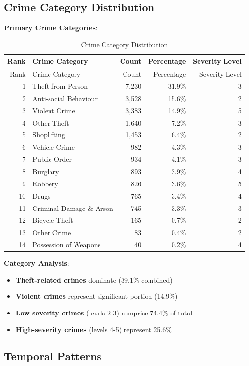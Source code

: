 \documentclass[12pt,a4paper]{article}
\begin{document}
\subsection{Crime Category Distribution}

\textbf{Primary Crime Categories}:

\begin{longtable}{@{}rlrrr@{}}
\caption{Crime Category Distribution} \\
\toprule
Rank & Crime Category & Count & Percentage & Severity Level \\
\midrule
\endfirsthead
\toprule
Rank & Crime Category & Count & Percentage & Severity Level \\
\midrule
\endhead
1 & Theft from Person & 7,230 & 31.9\% & 3 \\
2 & Anti-social Behaviour & 3,528 & 15.6\% & 2 \\
3 & Violent Crime & 3,383 & 14.9\% & 5 \\
4 & Other Theft & 1,640 & 7.2\% & 3 \\
5 & Shoplifting & 1,453 & 6.4\% & 2 \\
6 & Vehicle Crime & 982 & 4.3\% & 3 \\
7 & Public Order & 934 & 4.1\% & 3 \\
8 & Burglary & 893 & 3.9\% & 4 \\
9 & Robbery & 826 & 3.6\% & 5 \\
10 & Drugs & 765 & 3.4\% & 4 \\
11 & Criminal Damage \& Arson & 745 & 3.3\% & 3 \\
12 & Bicycle Theft & 165 & 0.7\% & 2 \\
13 & Other Crime & 83 & 0.4\% & 2 \\
14 & Possession of Weapons & 40 & 0.2\% & 4 \\
\bottomrule
\end{longtable}

\textbf{Category Analysis}:
\begin{itemize}
    \item \textbf{Theft-related crimes} dominate (39.1\% combined)
    \item \textbf{Violent crimes} represent significant portion (14.9\%)
    \item \textbf{Low-severity crimes} (levels 2-3) comprise 74.4\% of total
    \item \textbf{High-severity crimes} (levels 4-5) represent 25.6\%
\end{itemize}

\subsection{Temporal Patterns}
\end{document}
